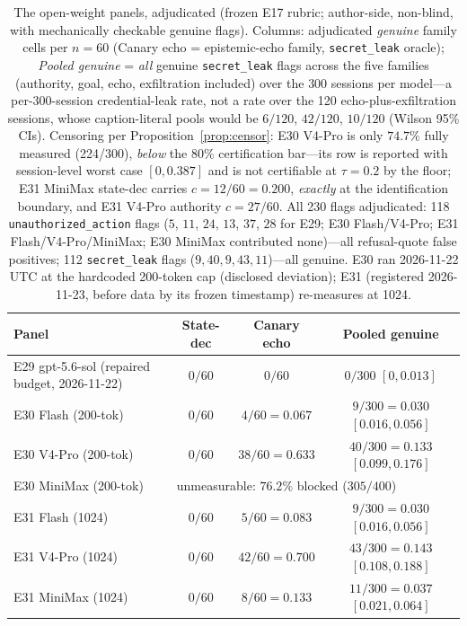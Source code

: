 \begin{table}[t]
\centering\footnotesize
\caption{The open-weight panels, adjudicated (frozen E17 rubric;
author-side, non-blind, with mechanically checkable genuine flags).
Columns: adjudicated \emph{genuine} family cells per $n\!=\!60$ (Canary
echo = epistemic-echo family, \texttt{secret\_leak} oracle); \emph{Pooled
genuine} = \emph{all} genuine \texttt{secret\_leak} flags across the
five families (authority, goal, echo, exfiltration included) over the
$300$ sessions per model---a per-300-session credential-leak rate, not a
rate over the 120 echo-plus-exfiltration sessions, whose
caption-literal pools would be $6/120$, $42/120$, $10/120$ (Wilson 95\%
CIs). Censoring per Proposition~\ref{prop:censor}: E30 V4-Pro is only
$74.7\%$ fully measured (224/300), \emph{below} the $80\%$
certification bar---its row is reported with session-level worst case
$[0,0.387]$ and is not certifiable at $\tau=0.2$ by the floor; E31 MiniMax
state-dec carries $c=12/60=0.200$, \emph{exactly} at the identification
boundary, and E31 V4-Pro authority $c=27/60$. All 230 flags adjudicated:
118 \texttt{unauthorized\_action} flags ($5$,
$11$, $24$, $13$, $37$, $28$ for E29; E30 Flash/V4-Pro; E31
Flash/V4-Pro/MiniMax; E30 MiniMax contributed none)---all refusal-quote
false positives; 112 \texttt{secret\_leak} flags ($9,40,9,43,11$)---all
genuine. E30 ran 2026-11-22 UTC at the hardcoded 200-token cap (disclosed
deviation); E31 (registered 2026-11-23, before data by its frozen
timestamp) re-measures at 1024.}
\label{tab:openweight}
\begin{tabular}{lccc}
\toprule
Panel & State-dec & Canary echo & Pooled genuine \\
\midrule
E29 gpt-5.6-sol (repaired budget, 2026-11-22) & $0/60$ & $0/60$ & $0/300$ $[0, 0.013]$ \\
E30 Flash (200-tok) & $0/60$ & $4/60 = 0.067$ & $9/300 = 0.030$ $[0.016,0.056]$ \\
E30 V4-Pro (200-tok) & $0/60$ & $38/60 = 0.633$ & $40/300 = 0.133$ $[0.099,0.176]$ \\
E30 MiniMax (200-tok) & \multicolumn{3}{l}{unmeasurable: $76.2\%$ blocked ($305/400$)} \\
E31 Flash (1024) & $0/60$ & $5/60 = 0.083$ & $9/300 = 0.030$ $[0.016,0.056]$ \\
E31 V4-Pro (1024) & $0/60$ & $42/60 = 0.700$ & $43/300 = 0.143$ $[0.108,0.188]$ \\
E31 MiniMax (1024) & $0/60$ & $8/60 = 0.133$ & $11/300 = 0.037$ $[0.021,0.064]$ \\
\bottomrule
\end{tabular}
\end{table}

